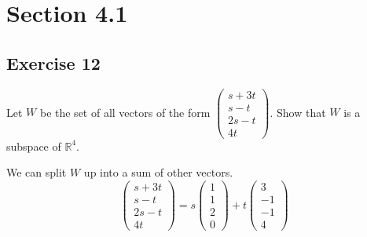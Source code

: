 \section*{Section 4.1}
  \subsection*{Exercise 12}
    Let $ W $ be the set of all vectors of the form $   \begin{pmatrix}
         s + 3t   \\ 
         s - t \\ 
         2s - t \\
         4t
      \end{pmatrix} $. 
    Show that $ W $ is a subspace of $ \mathbb R^{4} $. \newline \newline 

    We can split $ W $ up into a sum of other vectors. 
    $$
        \begin{pmatrix}
          s + 3t   \\ 
          s - t \\ 
          2s - t \\
          4t
        \end{pmatrix} = 
     s   \begin{pmatrix}
          1  \\ 
          1  \\ 
          2  \\
          0  
       \end{pmatrix} + 
    t   \begin{pmatrix}
         3  \\ 
         -1  \\ 
         -1  \\
         4  
      \end{pmatrix}
    $$
